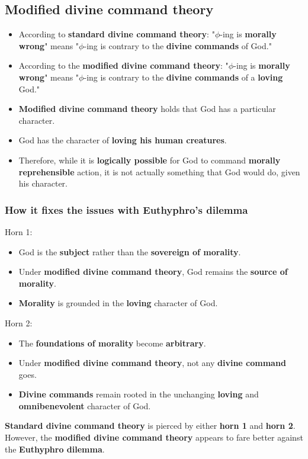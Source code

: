 \documentclass[11pt]{article}
\begin{document}
\subsection{Modified divine command theory}
\label{sec:orgc459d87}
\begin{itemize}
\item According to \textbf{standard divine command theory}:
"\(\phi\)-ing is \textbf{morally wrong}" means "\(\phi\)-ing is contrary to the \textbf{divine commands} of God."
\item According to the \textbf{modified divine command theory}:
"\(\phi\)-ing is \textbf{morally wrong}" means "\(\phi\)-ing is contrary to the \textbf{divine commands} of a \textbf{loving} God."
\item \textbf{Modified divine command theory} holds that God has a particular character.
\item God has the character of \textbf{loving his human creatures}.
\item Therefore, while it is \textbf{logically possible} for God to command \textbf{morally reprehensible} action, it is not actually something that God would do, given his character.
\end{itemize}
\subsubsection{How it fixes the issues with Euthyphro's dilemma}
\label{sec:org25c951a}
Horn 1:
\begin{itemize}
\item God is the \textbf{subject} rather than the \textbf{sovereign of morality}.
\item Under \textbf{modified divine command theory}, God remains the \textbf{source of morality}.
\item \textbf{Morality} is grounded in the \textbf{loving} character of God.
\end{itemize}

Horn 2:
\begin{itemize}
\item The \textbf{foundations of morality} become \textbf{arbitrary}.
\item Under \textbf{modified divine command theory}, not any \textbf{divine command} goes.
\item \textbf{Divine commands} remain rooted in the unchanging \textbf{loving} and \textbf{omnibenevolent} character of God.
\end{itemize}

\textbf{Standard divine command theory} is pierced by either \textbf{horn 1} and \textbf{horn 2}. However, the \textbf{modified divine command theory} appears to fare better against the \textbf{Euthyphro dilemma}.
\end{document}
